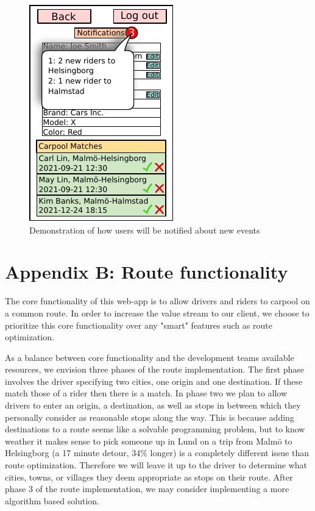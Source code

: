 \documentclass{article}
\begin{document}
\begin{figure}[!htpb]
\begin{minipage}{0.25\textwidth}
        \centering
        \includegraphics[scale=1]{profile3.pdf}
        \caption{Demonstration of how users will be notified about new events}
        \label{fig:profile3}
    \end{minipage}\hfill
\end{figure}

\newpage
\section{Appendix B: Route functionality}
The core functionality of this web-app is to allow drivers and riders to carpool on a common route. In order to increase the value stream to our client, we choose to prioritize this core functionality over any "smart" features such as route optimization.

As a balance between core functionality and the development teams available resources, we envision three phases of the route implementation. The first phase involves the driver specifying two cities, one origin and one destination. If these match those of a rider then there is a match. In phase two we plan to allow drivers to enter an origin, a destination, as well as stops in between which they personally consider as reasonable stops along the way. This is because adding destinations to a route seems like a solvable programming problem, but to know weather it makes sense to pick someone up in Lund on a trip from Malmö to Helsingborg (a 17 minute detour, 34\% longer) is a completely different issue than route optimization. Therefore we will leave it up to the driver to determine what cities, towns, or villages they deem appropriate as stops on their route. After phase 3 of the route implementation, we may consider implementing a more algorithm based solution.
\end{document}

